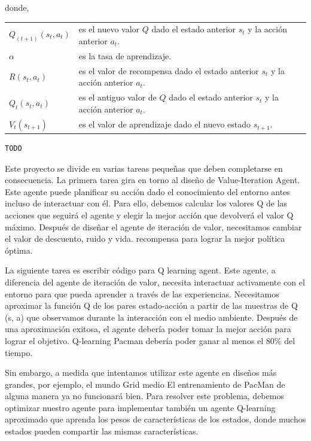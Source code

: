 \documentclass[11pt]{exam}
\makeatletter
\newenvironment{conditions}
{\par\vspace{\abovedisplayskip}\noindent\begin{tabular}{>{$}l<{$} @{${}\:{}$} l}}
	{\end{tabular}\par\vspace{\belowdisplayskip}}
\makeatother
\begin{document}
donde,

\begin{conditions}
Q_{(t+1)}(s_{t},a_{t}) & es el nuevo valor $Q$ dado el estado anterior $s_{t}$ y la acción anterior $a_{t}$. \\
\alpha & es la tasa de aprendizaje. \\
R(s_{t},a_{t}) & es el valor de recompensa dado el estado anterior $s_{t}$ y la acción anterior $a_{t}$.	\\
Q_{t}(s_{t},a_{t}) & es el antiguo valor de $Q$ dado el estado anterior $s_{t}$ y la acción anterior $a_{t}$.	\\
V_{t}(s_{t+1}) & es el valor de aprendizaje dado el nuevo estado $s_{t+1}$.
\end{conditions}

\begin{lstlisting}[language=python, basicstyle=\footnotesize]
TODO
\end{lstlisting}


Este proyecto se divide en varias tareas pequeñas que deben completarse en consecuencia. La primera tarea gira en torno al diseño de Value-Iteration Agent. Este agente puede planificar su acción dado el conocimiento del entorno antes incluso de interactuar con él. Para ello, debemos calcular los valores Q de las acciones que seguirá el agente y elegir la mejor acción que devolverá el valor Q máximo. Después de diseñar el agente de iteración de valor, necesitamos cambiar el valor de descuento, ruido y vida.
recompensa para lograr la mejor política óptima.

La siguiente tarea es escribir código para Q learning agent. Este agente, a diferencia del agente de iteración de valor, necesita interactuar activamente con el entorno para que pueda aprender a través de las experiencias. Necesitamos aproximar la función Q de los pares estado-acción a partir de las muestras de Q (s, a) que observamos durante la interacción con el medio ambiente. Después de una aproximación exitosa, el agente debería poder tomar la mejor acción para lograr el objetivo. Q-learning Pacman debería poder ganar al menos el 80\% del tiempo.

Sin embargo, a medida que intentamos utilizar este agente en diseños más grandes, por ejemplo, el mundo Grid medio
El entrenamiento de PacMan de alguna manera ya no funcionará bien. Para resolver este problema, debemos
optimizar nuestro agente para implementar también un agente Q-learning aproximado que aprenda los pesos de
características de los estados, donde muchos estados pueden compartir las mismas características.
\end{document}
